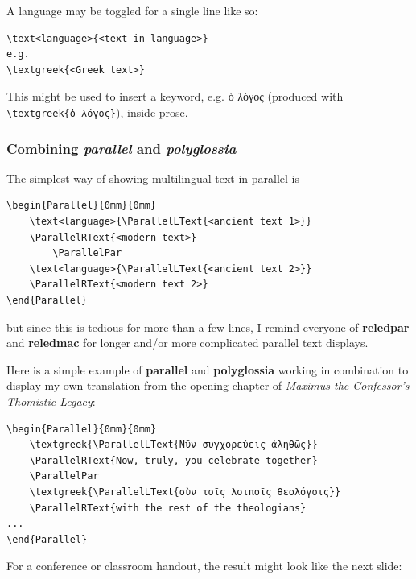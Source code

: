 \documentclass[aspectratio=169]{beamer}
\begin{document}
\begin{frame}[fragile]	
	
A language may be toggled for a single line like so: \break
	
{\footnotesize \begin{lstlisting}
\text<language>{<text in language>}
e.g.
\textgreek{<Greek text>}	\end{lstlisting}} \break
	
\vfill
This might be used to insert a keyword, e.g. \break 
{\textgreek{ὁ λόγος}} (produced with \verb|\textgreek{ὁ λόγος}|), \break
inside prose.
	
\end{frame}

\begin{frame}[fragile]
	\frametitle[Combining parallel and polyglossia]{Combining \textit{parallel} and \textit{polyglossia}}

The simplest way of showing multilingual text in parallel is \break

{\footnotesize \begin{lstlisting}
\begin{Parallel}{0mm}{0mm}
	\text<language>{\ParallelLText{<ancient text 1>}}
	\ParallelRText{<modern text>}
		\ParallelPar
	\text<language>{\ParallelLText{<ancient text 2>}}
	\ParallelRText{<modern text 2>}
\end{Parallel}	
\end{lstlisting}} \break

\vspace{1em}

but since this is tedious for more than a few lines, I remind everyone of \break \textbf{reledpar} and \textbf{reledmac} for longer and/or more complicated parallel text displays. \break

\end{frame}

\begin{frame}[fragile]

Here is a simple example of \textbf{parallel} and \textbf{polyglossia} working in combination to display my own translation from the opening chapter of \textit{Maximus the Confessor's Thomistic Legacy}:\break
	
{\footnotesize \begin{lstlisting}
\begin{Parallel}{0mm}{0mm}
	\textgreek{\ParallelLText{Νῦν συγχορεύεις ἀληθῶς}}
	\ParallelRText{Now, truly, you celebrate together}
	\ParallelPar
	\textgreek{\ParallelLText{σὺν τοῖς λοιποῖς θεολόγοις}}
	\ParallelRText{with the rest of the theologians}
...
\end{Parallel}	
	\end{lstlisting}} \break

For a conference or classroom handout, the result might look like the next slide:
	
\end{frame}
\end{document}
